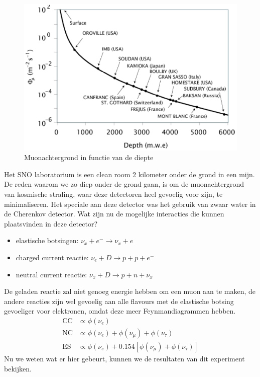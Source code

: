 \documentclass[../main.tex]{subfiles}
\begin{document}
\begin{figure}[h]
    \centering
    \includegraphics[width=0.5\linewidth]{neutrinos/muon_achtergrond_verval.png}
    \caption{Muonachtergrond in functie van de diepte}%
    \label{fig:neutrinos/muon_achtergrond_verval}
\end{figure}

Het SNO laboratorium is een clean room 2 kilometer onder de grond in een mijn. De reden waarom we zo diep onder de grond gaan, is om de muonachtergrond van kosmische straling, waar deze detectoren heel gevoelig voor zijn, te minimaliseren. Het speciale aan deze detector was het gebruik van zwaar water in de Cherenkov detector. Wat zijn nu de mogelijke interacties die kunnen plaatsvinden in deze detector?
\begin{itemize}
    \item elastische botsingen: $\nu_{x}+e^{-} \rightarrow \nu_{x}+e$
    \item charged current reactie: $\nu_{e}+D \rightarrow p+p+e^{-}$
    \item neutral current reactie: $\nu_{x}+D \rightarrow p+n+\nu_{x}$
\end{itemize}
De geladen reactie zal niet genoeg energie hebben om een muon aan te maken, de andere reacties zijn wel gevoelig aan alle flavours met de elastische botsing gevoeliger voor elektronen, omdat deze meer Feynmandiagrammen hebben.
\begin{equation}
    \begin{aligned}
        \label{eq:sno_flavour_gevoeligheid}
        \mathrm{CC} &\propto \phi\left(\nu_{e}\right) \\
        \mathrm{NC} &\propto \phi\left(\nu_{e}\right)+\phi\left(\nu_{\mu}\right)+\phi\left(\nu_{\tau}\right) \\
        \mathrm{ES} &\propto \phi\left(\nu_{e}\right)+0.154\left[\phi\left(\nu_{\mu}\right)+\phi\left(\nu_{\tau}\right)\right]
    \end{aligned}
\end{equation}
Nu we weten wat er hier gebeurt, kunnen we de resultaten van dit experiment bekijken.
\end{document}
